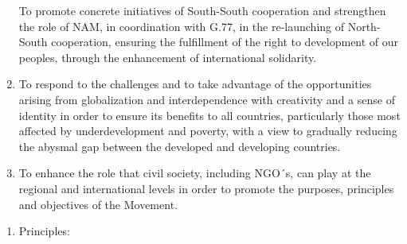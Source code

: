 \documentclass[
  openany]{book}
\providecommand{\tightlist}{%
  \setlength{\itemsep}{0pt}\setlength{\parskip}{0pt}}
\begin{document}
\begin{enumerate}
  To promote concrete initiatives of South-South cooperation and strengthen the role of NAM, in coordination with G.77, in the re-launching of North-South cooperation, ensuring the fulfillment of the right to development of our peoples, through the enhancement of international solidarity.
\item
  To respond to the challenges and to take advantage of the opportunities arising from globalization and interdependence with creativity and a sense of identity in order to ensure its benefits to all countries, particularly those most affected by underdevelopment and poverty, with a view to gradually reducing the abysmal gap between the developed and developing countries.
\item
  To enhance the role that civil society, including NGO´s, can play at the regional and international levels in order to promote the purposes, principles and objectives of the Movement.
\end{enumerate}

\begin{enumerate}
\def\labelenumi{\Roman{enumi}.}
\setcounter{enumi}{1}
\tightlist
\item
  Principles:
\end{enumerate}
\end{document}
